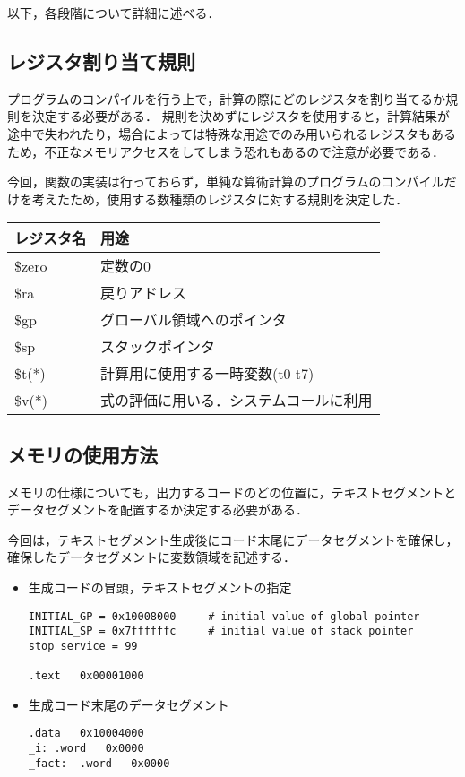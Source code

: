 \documentclass[a4j]{jarticle}
\begin{document}
以下，各段階について詳細に述べる．

\subsection{レジスタ割り当て規則}
プログラムのコンパイルを行う上で，計算の際にどのレジスタを割り当てるか規則を決定する必要がある．
規則を決めずにレジスタを使用すると，計算結果が途中で失われたり，場合によっては特殊な用途でのみ用いられるレジスタもあるため，不正なメモリアクセスをしてしまう恐れもあるので注意が必要である．

今回，関数の実装は行っておらず，単純な算術計算のプログラムのコンパイルだけを考えたため，使用する数種類のレジスタに対する規則を決定した．
\begin{center}
\begin{table}[htb]
  \begin{tabular}{|l|l|} \hline
    レジスタ名 & 用途  \\ \hline
    \$zero & 定数の0  \\
    \$ra & 戻りアドレス  \\
    \$gp & グローバル領域へのポインタ  \\ 
    \$sp & スタックポインタ  \\
    \$t(*) & 計算用に使用する一時変数(t0-t7)  \\
    \$v(*) & 式の評価に用いる．システムコールに利用  \\ \hline
  \end{tabular}
\end{table}
\end{center}

\subsection{メモリの使用方法}
メモリの仕様についても，出力するコードのどの位置に，テキストセグメントとデータセグメントを配置するか決定する必要がある．

今回は，テキストセグメント生成後にコード末尾にデータセグメントを確保し，確保したデータセグメントに変数領域を記述する．

\begin{itemize}
\item 生成コードの冒頭，テキストセグメントの指定
\begin{verbatim}
INITIAL_GP = 0x10008000		# initial value of global pointer
INITIAL_SP = 0x7ffffffc		# initial value of stack pointer
stop_service = 99

.text	0x00001000
\end{verbatim}

\item 生成コード末尾のデータセグメント
\begin{verbatim}
.data	0x10004000
_i:	.word	0x0000
_fact:	.word	0x0000
\end{verbatim}

\end{itemize}
\end{document}
